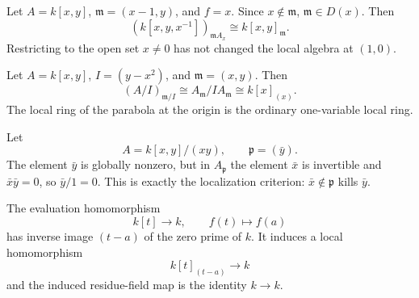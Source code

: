\begin{example}
Let $A=k[x,y]$, $\mathfrak m=(x-1,y)$, and $f=x$.  Since $x\notin\mathfrak m$,
$\mathfrak m\in D(x)$.  Then
\[
(k[x,y,x^{-1}])_{\mathfrak mA_x}
\cong
k[x,y]_{\mathfrak m}.
\]
Restricting to the open set $x\neq0$ has not changed the local algebra at $(1,0)$.
\end{example}

\begin{example}
Let $A=k[x,y]$, $I=(y-x^2)$, and $\mathfrak m=(x,y)$.  Then
\[
(A/I)_{\mathfrak m/I}
\cong
A_{\mathfrak m}/IA_{\mathfrak m}
\cong
k[x]_{(x)}.
\]
The local ring of the parabola at the origin is the ordinary one-variable local ring.
\end{example}

\begin{example}
Let
\[
A=k[x,y]/(xy),\qquad \mathfrak p=(\bar y).
\]
The element $\bar y$ is globally nonzero, but in $A_{\mathfrak p}$ the element $\bar x$ is
invertible and $\bar x\bar y=0$, so $\bar y/1=0$.  This is exactly the localization criterion:
$\bar x\notin\mathfrak p$ kills $\bar y$.
\end{example}

\begin{example}
The evaluation homomorphism
\[
k[t]\longrightarrow k,\qquad f(t)\longmapsto f(a)
\]
has inverse image $(t-a)$ of the zero prime of $k$.  It induces a local homomorphism
\[
k[t]_{(t-a)}\longrightarrow k
\]
and the induced residue-field map is the identity $k\to k$.
\end{example}
